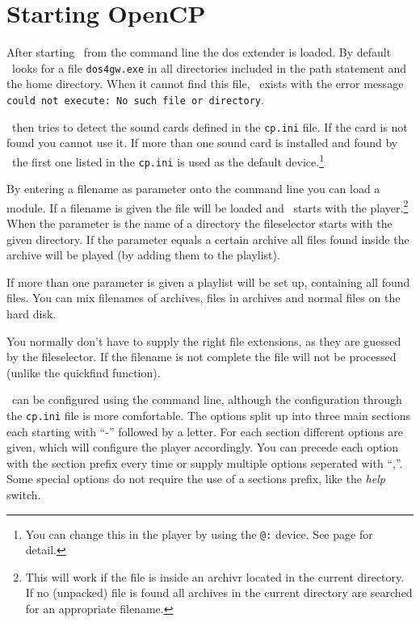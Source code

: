 %
%

\chapter{Starting OpenCP}
After starting \cp\ from the command line the dos extender is loaded. By
default \cp\ looks for a file \texttt{dos4gw.exe} in all
directories included in the path statement and the home directory.
When it cannot find this file, \cp\ exists with the error message
\texttt{could not execute: No such file or directory}.

\cp\ then tries to detect the sound cards defined in the \texttt{cp.ini} file.
If the card is not found you cannot use it. If more than one sound card is
installed and found by \cp\ the first one listed in the \texttt{cp.ini} is
used as the default device.\footnote{You can change this in the player by using
the \texttt{@:} device. See page \pageref{specialdrive} for detail.}

By entering a filename as parameter onto the command line you can load a module.
If a filename is given the file will be loaded and \cp\ starts with the
player.\footnote{This will work if the file is inside an archivr located in the
current directory. If no (unpacked) file is found all archives in the current
directory are searched for an appropriate filename.} When the parameter is
the name of a directory the fileselector starts with the given directory.
If the parameter equals a certain archive all files found inside the archive
will be played (by adding them to the playlist).

If more than one parameter is given a playlist will be set up, containing all
found files. You can mix filenames of archives, files in archives and normal
files on the hard disk.

You normally don't have to supply the right file extensions, as they are
guessed by the fileselector. If the filename is not complete the file will
not be processed (unlike the quickfind function).

\cp\ can be configured using the command line, although the configuration
through the \texttt{cp.ini} file is more comfortable. The options split up
into three main sections each starting with ``-'' followed by a letter. For
each section different options are given, which will configure the player
accordingly. You can precede each option with the section prefix every time
or supply multiple options seperated with ``,''. Some special options do not
require the use of a sections prefix, like the \emph{help} switch.

